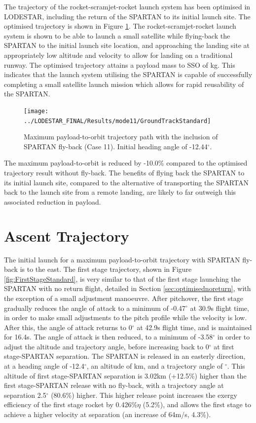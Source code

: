 The trajectory of the rocket-scramjet-rocket launch system has been optimised in LODESTAR, including the return of the SPARTAN to its initial launch site. The optimised trajectory is shown in Figure \ref{fig:GroundTrackStandard}. 
The rocket-scramjet-rocket launch system is shown to be able to launch a small satellite 
while flying-back the SPARTAN to the initial launch site location, and approaching the landing site at appropriately low altitude and velocity to allow for landing on a traditional runway. 
The optimised trajectory attains a payload mass to SSO of \PayloadToOrbitStandard kg. 
This indicates that the launch system utilising the SPARTAN is capable of successfully completing a small satellite launch mission which allows for rapid reusability of the SPARTAN. 
\begin{figure}[ht!]
	\centering
	\texttt{[image: ../LODESTAR\_FINAL/Results/mode11/GroundTrackStandard]}
	\caption{Maximum payload-to-orbit trajectory path with the inclusion of SPARTAN fly-back (Case 11). Initial heading angle of -12.44$^\circ$.}
	\label{fig:GroundTrackStandard}
\end{figure}
The maximum payload-to-orbit is reduced by -10.0\% compared to the optimised trajectory result without fly-back. The benefits of flying back the SPARTAN to its initial launch site, compared to the alternative of transporting the SPARTAN back to the launch site from a remote landing, are likely to far outweigh this associated reduction in payload. 



\section{Ascent Trajectory}

 The initial launch for a maximum payload-to-orbit trajectory with SPARTAN fly-back is to the east.
 The first stage trajectory, shown in Figure \ref{fig:FirstStageStandard}, is very similar to that of the first stage launching the SPARTAN with no return flight, detailed in Section \ref{sec:optimisednoreturn}, with the exception of a small adjustment manoeuvre. 
 After pitchover, the first stage gradually reduces the angle of attack to a minimum of -0.47$^\circ$ at 30.9s flight time, in order to make small adjustments to the pitch profile while the velocity is low. After this, the angle of attack returns to 0$^\circ$ at 42.9s flight time, and is maintained for 16.4s.
 The angle of attack is then reduced, to a minimum of -3.58$^\circ$ in order to adjust the altitude and trajectory angle, before increasing back to 0$^\circ$ at first stage-SPARTAN separation. 
 The SPARTAN is released in an easterly direction, at a heading angle of -12.4$^\circ$, an altitude of \firstsecondSeparationAltStandard km, and a trajectory angle of \firstsecondSeparationgammaStandard $^\circ$. 
 This altitude of first stage-SPARTAN separation is 3.02km (+12.5\%) higher than the first stage-SPARTAN release with no fly-back, with a trajectory angle at separation 2.5$^\circ$ (80.6\%) higher. 
 This higher release point increases the exergy efficiency of the first stage rocket by 0.426\%$\eta$ (5.2\%), and allows the first stage to achieve a higher velocity at separation (an increase of 64m/s, 4.3\%). 
 
